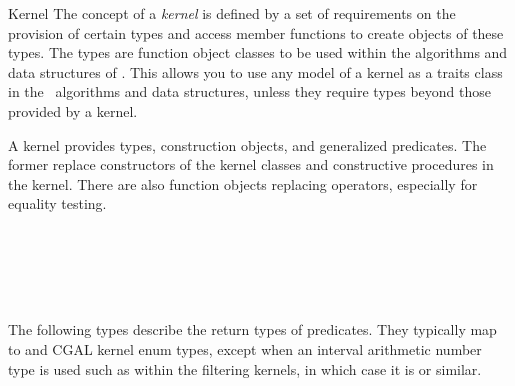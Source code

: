 \begin{ccRefConcept}{Kernel}
The concept of a {\em kernel} is defined by a set of requirements on
the provision of certain types and access member functions to create
objects of these types. The types are function object classes to be used
within the algorithms and data structures of \cgal.
This allows you to use any model of a kernel as a traits class in
the \cgal\ algorithms and data structures, unless they require types
beyond those provided by a kernel.


A kernel provides types, construction objects, and generalized predicates.
The former replace constructors of the kernel classes and constructive
procedures in the kernel. There are also function objects replacing operators,
especially for equality testing.

\ccHasModels

 \\
 \\
 \\
 \\


\ccTypes

\ccGlue
{}

The following types describe the return types of predicates.  They typically
map to  and CGAL kernel enum types, except when an interval arithmetic
number type is used such as within the filtering kernels, in which case it is
 or similar.

\ccGlue
{}
\ccGlue
{}
\ccGlue
{}
\ccGlue
{}
\ccGlue
{}
\ccGlue
{}


\end{ccRefConcept}
